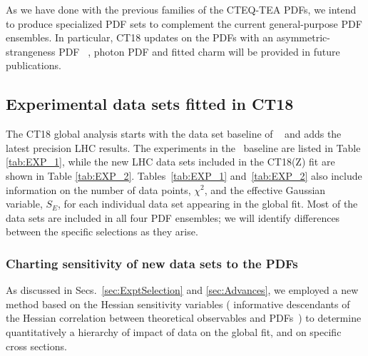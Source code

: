 As we have done with the previous families of the CTEQ-TEA PDFs, we intend to produce specialized PDF sets to complement the current general-purpose PDF ensembles. In particular, CT18 updates on the PDFs with an asymmetric-strangeness PDF~ \cite{Lai:2007dq}, photon PDF \cite{Schmidt:2015zda} and fitted charm \cite{Hou:2017khm} will be provided in future publications. 

\subsection{Experimental data sets fitted in CT18}
\label{sec:data_overview}

The CT18 global analysis starts with the data set baseline of \CTHERAII~\cite{Hou:2016nqm} and adds the latest precision LHC results. The experiments in the \CTHERAII~baseline
are listed in Table \ref{tab:EXP_1}, while the new LHC data sets included in the CT18(Z) fit are shown in Table \ref{tab:EXP_2}. 
Tables~\ref{tab:EXP_1} and~\ref{tab:EXP_2}
also include information on the number of data points, $\chi^2$, and the effective Gaussian variable, $S_E$, for each individual data set appearing in the global fit.   
%
Most of the data sets are included in all four PDF ensembles; we  will identify differences between the specific selections as they arise.
%

\subsubsection{Charting sensitivity of new data sets to the PDFs \label{sec:Sensitivity} }

As discussed in Secs.~\ref{sec:ExptSelection} and \ref{sec:Advances}, we employed a new method based on the Hessian sensitivity variables \cite{Wang:2018heo,Hobbs:2019gob} ( informative descendants of the Hessian correlation between theoretical observables and PDFs~\cite{Pumplin:2001ct,Nadolsky:2001yg,Nadolsky:2008zw}) 
to determine quantitatively a hierarchy of impact of data on the global fit, and on specific cross sections. 

